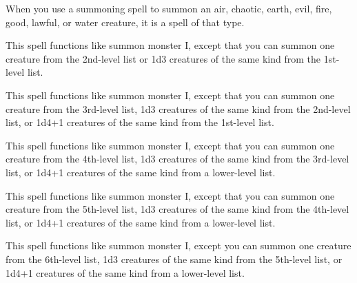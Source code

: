 \begin{multicols}{2}
\begin{small}
\smallskip\noindent When you use a summoning spell to summon an air, chaotic, earth, evil, fire, good, lawful, or water creature, it is a spell of that type.


\noindent This spell functions like summon monster I, except that you can summon one creature from the 2nd-level list or 1d3 creatures of the same kind from the 1st-level list.

\noindent This spell functions like summon monster I, except that you can summon one creature from the 3rd-level list, 1d3 creatures of the same kind from the 2nd-level list, or 1d4+1 creatures of the same kind from the 1st-level list.

\noindent This spell functions like summon monster I, except that you can summon one creature from the 4th-level list, 1d3 creatures of the same kind from the 3rd-level list, or 1d4+1 creatures of the same kind from a lower-level list.

\noindent This spell functions like summon monster I, except that you can summon one creature from the 5th-level list, 1d3 creatures of the same kind from the 4th-level list, or 1d4+1 creatures of the same kind from a lower-level list.

\noindent This spell functions like summon monster I, except you can summon one creature from the 6th-level list, 1d3 creatures of the same kind from the 5th-level list, or 1d4+1 creatures of the same kind from a lower-level list.


\end{small}
\end{multicols}
